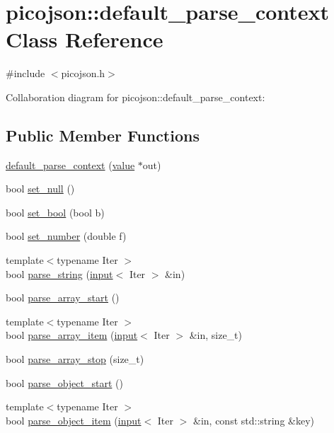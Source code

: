 \hypertarget{classpicojson_1_1default__parse__context}{}\section{picojson\+:\+:default\+\_\+parse\+\_\+context Class Reference}
\label{classpicojson_1_1default__parse__context}


{\ttfamily \#include $<$picojson.\+h$>$}



Collaboration diagram for picojson\+:\+:default\+\_\+parse\+\_\+context\+:
\subsection*{Public Member Functions}
\begin{DoxyCompactItemize}
\item 
\hyperlink{classpicojson_1_1default__parse__context_ad326572abe85f9d05dc23be4cf76ff3c}{default\+\_\+parse\+\_\+context} (\hyperlink{classpicojson_1_1value}{value} $\ast$out)
\item 
bool \hyperlink{classpicojson_1_1default__parse__context_a2d852ba1f0b115c89378fcb5f10580b5}{set\+\_\+null} ()
\item 
bool \hyperlink{classpicojson_1_1default__parse__context_ae1935ef455fc2bed9195426cfee5713a}{set\+\_\+bool} (bool b)
\item 
bool \hyperlink{classpicojson_1_1default__parse__context_a9b2046a9cb6d66aad835b84ffda20b86}{set\+\_\+number} (double f)
\item 
{\footnotesize template$<$typename Iter $>$ }\\bool \hyperlink{classpicojson_1_1default__parse__context_a476c7d30a5cf382b48201ec64585c2f3}{parse\+\_\+string} (\hyperlink{classpicojson_1_1input}{input}$<$ Iter $>$ \&in)
\item 
bool \hyperlink{classpicojson_1_1default__parse__context_a5c355f843ceacde134997f5bbbda1d23}{parse\+\_\+array\+\_\+start} ()
\item 
{\footnotesize template$<$typename Iter $>$ }\\bool \hyperlink{classpicojson_1_1default__parse__context_a5f65224e655633b20c1f8c5967c153bb}{parse\+\_\+array\+\_\+item} (\hyperlink{classpicojson_1_1input}{input}$<$ Iter $>$ \&in, size\+\_\+t)
\item 
bool \hyperlink{classpicojson_1_1default__parse__context_aa6ac46d87d620377429438675ba9fab2}{parse\+\_\+array\+\_\+stop} (size\+\_\+t)
\item 
bool \hyperlink{classpicojson_1_1default__parse__context_a54eba00b93ce4cdaf8b2acac4ef3e046}{parse\+\_\+object\+\_\+start} ()
\item 
{\footnotesize template$<$typename Iter $>$ }\\bool \hyperlink{classpicojson_1_1default__parse__context_adf71929b098e4f4b5c32222af149655a}{parse\+\_\+object\+\_\+item} (\hyperlink{classpicojson_1_1input}{input}$<$ Iter $>$ \&in, const std\+::string \&key)
\end{DoxyCompactItemize}
